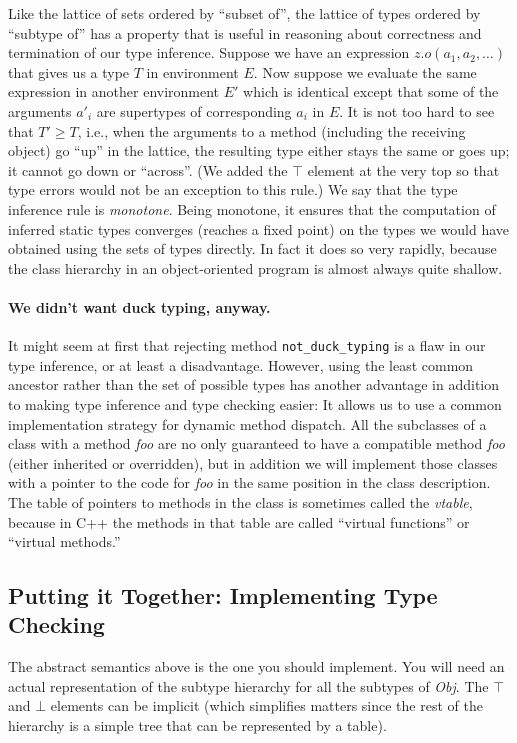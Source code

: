 \documentclass[11pt]{article}
\begin{document}
Like the lattice of sets ordered by ``subset of'', the lattice of
types ordered by ``subtype of'' has a property that is useful in
reasoning about correctness and termination of our type
inference.   Suppose we have an expression \( z.o(a_1, a_2, \ldots )\)
that gives us a type $T$ in environment $E$.  Now suppose we evaluate
the same expression in another environment $E'$ which is identical
except that some of the arguments $a'_i$ are supertypes of
corresponding $a_i$ in $E$.  It is not too hard to see that $T' \ge
T$, i.e., when the arguments to a method (including the receiving
object) go ``up'' in the lattice, the resulting type either stays the
same or goes up;  it cannot go down or ``across''.   (We added the
$\top$ element at the very top so that type errors would not be an
exception to this rule.)   
 We say that the
type inference rule is \emph{monotone}.   Being monotone, it ensures
that the computation of inferred static types converges (reaches a
fixed point) on the types we would have obtained using the sets of
types directly.  In fact it does so very rapidly, because the class
hierarchy in an object-oriented program is almost always quite
shallow.

\paragraph{We didn't want duck typing, anyway.}
It might seem at first that rejecting method \verb|not_duck_typing| is
a flaw in our type inference, or at least a disadvantage.  However,
using the least common ancestor rather than the set of possible types
has another advantage in addition to making type inference and type
checking easier:  It allows us to use a common implementation strategy
for dynamic method dispatch.  All the subclasses of a class with a
method \emph{foo} are no only guaranteed to have a compatible method
\emph{foo}  (either inherited or overridden), but in addition we will
implement those classes with a pointer to the code for \emph{foo} in
the same position in the class description.  The table of pointers to
methods in the class is sometimes called the \emph{vtable}, because in
C++ the methods in that table are called ``virtual functions'' or
``virtual methods.''  

\subsection{Putting it Together: Implementing Type Checking}

The abstract semantics above is the one you should implement.  You
will need an actual representation of the subtype hierarchy for all
the subtypes of \emph{Obj}.  The $\top$ and $\bot$ elements can be
implicit (which simplifies matters since the rest of the hierarchy is
a simple tree that can be represented by a table).  
\end{document}
